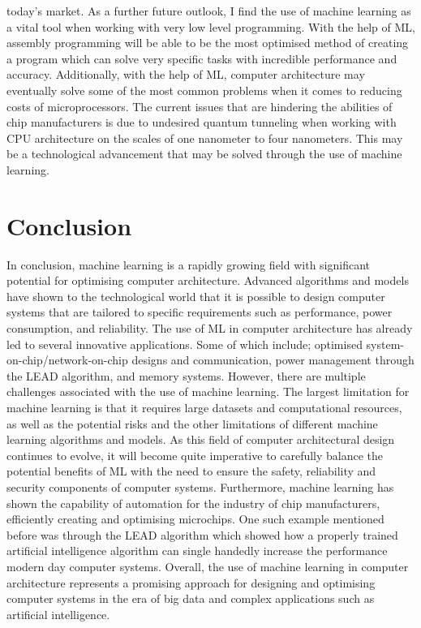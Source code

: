 \documentclass[conference]{IEEEtran}
\begin{document}
today's market. As a further future outlook, I find the use of machine learning as a vital tool when working with very low level programming. With the help of ML, assembly programming 
will be able to be the most optimised method of creating a program which can solve very specific tasks with incredible performance and accuracy. Additionally, with the help of ML, 
computer architecture may eventually solve some of the most common problems when it comes to reducing costs of microprocessors. The current issues that are hindering the abilities of chip 
manufacturers is due to undesired quantum tunneling when working with CPU architecture on the scales of one nanometer to four nanometers. This may be a technological advancement that may 
be solved through the use of machine learning. 

\section{Conclusion} 
In conclusion, machine learning is a rapidly growing field with significant potential for optimising computer architecture. Advanced algorithms and models have shown to the technological 
world that it is possible to design computer systems that are tailored to specific requirements such as performance, power consumption, and reliability. The use of ML in computer architecture 
has already led to several innovative applications. Some of which include; optimised system-on-chip/network-on-chip designs and communication, power management through the LEAD algorithm, 
and memory systems. However, there are multiple challenges associated with the use of machine learning. The largest limitation for machine learning is that it requires large datasets and 
computational resources, as well as the potential risks and the other limitations of different machine learning algorithms and models. As this field of computer architectural design continues 
to evolve, it will become quite imperative to carefully balance the potential benefits of ML with the need to ensure the safety, reliability and security components of computer systems. Furthermore, 
machine learning has shown the capability of automation for the industry of chip manufacturers, efficiently creating and optimising microchips. One such example mentioned before was through the 
LEAD algorithm which showed how a properly trained artificial intelligence algorithm can single handedly increase the performance modern day computer systems. Overall, the use of machine learning 
in computer architecture represents a promising approach for designing and optimising computer systems in the era of big data and complex applications such as artificial intelligence.
\end{document}
